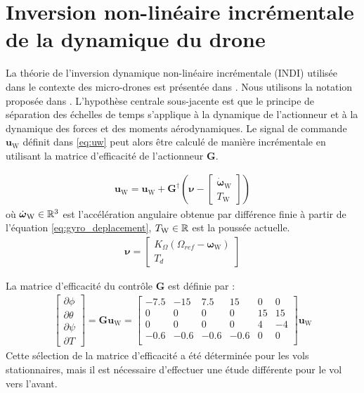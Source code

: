 \section{Inversion non-linéaire incrémentale de la dynamique du drone}

La théorie de l'inversion dynamique non-linéaire incrémentale (INDI) utilisée dans le contexte des micro-drones est présentée dans \cite{smeurINDI}. Nous utilisons la notation proposée dans \cite{smeurINDITail}. L'hypothèse centrale sous-jacente est que le principe de séparation des échelles de temps s'applique à la dynamique de l'actionneur et à la dynamique des forces et des moments aérodynamiques. Le signal de commande $\boldsymbol{u}_{\text{W}}$ définit dans \eqref{eq:uw} peut alors être calculé de manière incrémentale en utilisant la matrice d'efficacité de l'actionneur $\boldsymbol{G}$.

\begin{align}
    \label{eq:INDI}
    \boldsymbol{u}_{\text{W}} = \boldsymbol{u}_{\text{W}} + \boldsymbol{G}^{\dag} (\boldsymbol{\nu} - \begin{bmatrix}
    \dot{\boldsymbol{\omega}}_{\text{W}} \\
    T_{\text{W}}
    \end{bmatrix})
\end{align}
où  $ \dot{\boldsymbol{\omega}}_{\text{W}} \in {\mathbb R}^{3}$ est l'accélération angulaire obtenue par différence finie à partir de l'équation \eqref{eq:gyro_deplacement},  $T_{\text{W}} \in {\mathbb R}$ est la poussée actuelle.
\begin{align}
    \boldsymbol{\nu} = \begin{bmatrix}
        K_{\Omega} (\Omega_{ref}-\boldsymbol{\omega}_{\text{W}})\\
        T_{d}
    \end{bmatrix}
\end{align}


La matrice d'efficacité du contrôle $\boldsymbol{G}$ est définie par :
\begin{align*}
    \begin{bmatrix}
    \partial \phi \\
    \partial \theta \\
    \partial \psi \\
    \partial T
    \end{bmatrix}\! =\! \boldsymbol{G} \boldsymbol{u}_{\text{W}} \!=\!
    \begin{bmatrix}
    -7.5 & -15 & 7.5 & 15 & 0 & 0\\
    0 & 0 & 0 & 0 & 15 & 15 \\
    0 & 0 & 0 & 0 & 4 & -4 \\
    -0.6 & -0.6 & -0.6 & -0.6 & 0 & 0\\
    \end{bmatrix}
    \boldsymbol{u}_{\text{W}}
\end{align*}
Cette sélection de la matrice d'efficacité a été déterminée pour les vols stationnaires, mais il est nécessaire d'effectuer une étude différente pour le vol vers l'avant.

